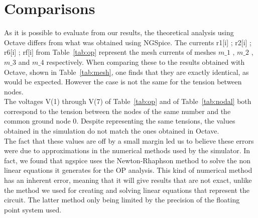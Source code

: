 \section{Comparisons}
\label{sec:comparisons}

As it is possible to evaluate from our results, the theoretical analysis using Octave differs from what was obtained using NGSpice. The currents r1[i] ; r2[i] ; r6[i] ; rf[i] from Table~\ref{tab:op} represent the mesh currents of meshes $m\_1$ , $m\_2$ , $m\_3$ and $m\_4$ respectively. When comparing these to the results obtained with Octave, shown in Table~\ref{tab:mesh}, one finds that they are exactly identical, as would be expected. However the case is not the same for the tension between nodes.\\
The voltages V(1) through V(7) of Table~\ref{tab:op} and of Table~\ref{tab:nodal} both correspond to the tension between the nodes of the same number and the common ground node 0. Despite representing the same tensions, the values obtained in the simulation do not match the ones obtained in Octave.\\
The fact that these values are off by a small margin led us to believe these errors were due to approximations in the numerical methods used by the simulator. In fact, we found that ngspice uses the Newton-Rhaphson method \cite{codecs} to solve the non linear equations it generates for the OP analysis. This kind of numerical method has an inherent error, meaning that it will give results that are not exact, unlike the method we used for creating and solving linear equations that represent the circuit. The latter method only being limited by the precision of the floating point system used.
